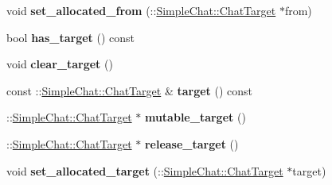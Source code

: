 \begin{DoxyCompactItemize}
\item 
\hypertarget{classSimpleChat_1_1ChatMessage_aecb81c970857879f6e8261d1cfb4ecaf}{void {\bfseries set\-\_\-allocated\-\_\-from} (\-::\hyperlink{classSimpleChat_1_1ChatTarget}{Simple\-Chat\-::\-Chat\-Target} $\ast$from)}\label{classSimpleChat_1_1ChatMessage_aecb81c970857879f6e8261d1cfb4ecaf}

\item 
\hypertarget{classSimpleChat_1_1ChatMessage_a704f255c6091ba78db772cf78fde0c29}{bool {\bfseries has\-\_\-target} () const }\label{classSimpleChat_1_1ChatMessage_a704f255c6091ba78db772cf78fde0c29}

\item 
\hypertarget{classSimpleChat_1_1ChatMessage_a144663c85b22b0f79a079c0c575ce96f}{void {\bfseries clear\-\_\-target} ()}\label{classSimpleChat_1_1ChatMessage_a144663c85b22b0f79a079c0c575ce96f}

\item 
\hypertarget{classSimpleChat_1_1ChatMessage_ae3d85472b51805a691e2356b7955a46d}{const \-::\hyperlink{classSimpleChat_1_1ChatTarget}{Simple\-Chat\-::\-Chat\-Target} \& {\bfseries target} () const }\label{classSimpleChat_1_1ChatMessage_ae3d85472b51805a691e2356b7955a46d}

\item 
\hypertarget{classSimpleChat_1_1ChatMessage_a626e31c4eef74b9166d0e848ab4fa74e}{\-::\hyperlink{classSimpleChat_1_1ChatTarget}{Simple\-Chat\-::\-Chat\-Target} $\ast$ {\bfseries mutable\-\_\-target} ()}\label{classSimpleChat_1_1ChatMessage_a626e31c4eef74b9166d0e848ab4fa74e}

\item 
\hypertarget{classSimpleChat_1_1ChatMessage_abf2b496e1ea68299c1064d2ac6704c09}{\-::\hyperlink{classSimpleChat_1_1ChatTarget}{Simple\-Chat\-::\-Chat\-Target} $\ast$ {\bfseries release\-\_\-target} ()}\label{classSimpleChat_1_1ChatMessage_abf2b496e1ea68299c1064d2ac6704c09}

\item 
\hypertarget{classSimpleChat_1_1ChatMessage_a7c2bfae57846308a1a553b70b558ce99}{void {\bfseries set\-\_\-allocated\-\_\-target} (\-::\hyperlink{classSimpleChat_1_1ChatTarget}{Simple\-Chat\-::\-Chat\-Target} $\ast$target)}\label{classSimpleChat_1_1ChatMessage_a7c2bfae57846308a1a553b70b558ce99}

\end{DoxyCompactItemize}
